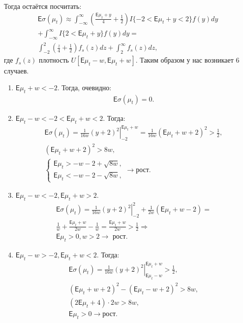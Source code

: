 \documentclass[12pt, twoside]{article}
\begin{document}
Тогда остаётся посчитать:
\begin{gather*}
  \mathsf{E} \sigma(\mu_t) \approx \int_{-\infty}^{\infty} \left(\frac{\mathsf{E} \mu_t + y}{4} + \frac{1}{2} \right) I\{-2 < \mathsf{E}\mu_t +y < 2\} f(y)dy \\
  + \int_{-\infty}^{\infty} I\{2 < \mathsf{E}\mu_t +y \}f(y) dy = \\
  \int_{-2}^{2} \left(\frac{z}{4} + \frac{1}{2} \right) f_s(z)dz 
  + \int_{2}^{\infty} f_s(z) dz,
\end{gather*}
где $f_s(z)$ плотность $U[\mathsf{E}\mu_t - w, \mathsf{E}\mu_t + w]$.
Таким образом у нас возникает $6$ случаев.

\begin{enumerate}
  \item $\mathsf{E} \mu_t + w < -2$. Тогда, очевидно:
    \begin{gather*}
      \mathsf{E}\sigma(\mu_t) = 0.
    \end{gather*}

  \item $\mathsf{E}\mu_t - w < -2 < \mathsf{E}\mu_t + w < 2$. Тогда:
    \begin{gather*}
      \mathsf{E}\sigma(\mu_t) = \left. \frac{1}{16w} (y+2)^2 \right|_{-2}^{\mathsf{E}\mu_t + w} = 
        \frac{1}{16w} (\mathsf{E}\mu_t + w + 2)^2 > \frac{1}{2}, \\
        (\mathsf{E}\mu_t + w + 2)^2 > 8w, \\
    \begin{cases}
      \mathsf{E}\mu_t > -w - 2 + \sqrt{8w}, \\
      \mathsf{E}\mu_t < -w - 2 - \sqrt{8w}, 
    \end{cases} \to \text{рост}.
    \end{gather*}

  \item $\mathsf{E}\mu_t - w < -2, \mathsf{E}\mu_t + w > 2$. 
    \begin{gather*}
      \mathsf{E}\sigma(\mu_t) = \left. \frac{1}{16 w} (y+2)^2 \right|_{-2}^{2} + \frac{1}{2 w}(\mathsf{E}\mu_t + w -2) = \\
        \frac{1}{w} + \frac{\mathsf{E}\mu_t+w}{2w} - \frac{1}{w} = \frac{\mathsf{E}\mu_t + w}{2 w} > \frac{1}{2} \Rightarrow \\
        \mathsf{E}\mu_t > 0, w > 2 \to \text{ рост}.
    \end{gather*}
  
  \item $\mathsf{E}\mu_t - w > -2, \mathsf{E}\mu_t + w < 2$. Тогда:
    \begin{gather*}
      \mathsf{E}\sigma(\mu_t) = \left. \frac{1}{16 w} (y+2)^2 \right|_{\mathsf{E}\mu_t - w}^{\mathsf{E}\mu_t + w} > \frac{1}{2},\\
        (\mathsf{E}\mu_t + w + 2)^2 - (\mathsf{E}\mu_t - w + 2)^2 > 8w,\\
        (2 \mathsf{E}\mu_t + 4) \cdot 2w > 8w,\\
        \mathsf{E} \mu_t  > 0 \to \text{рост}. 
    \end{gather*}
  

\end{enumerate}
\end{document}
